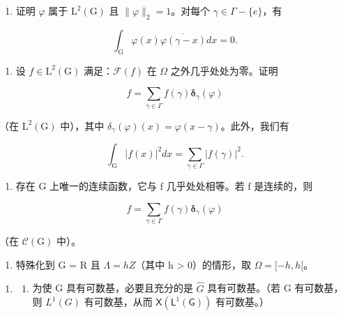 \begin{enumerate}
\def\labelenumi{\alph{enumi})}
\setcounter{enumi}{2}
\tightlist
\item
  证明 \(\varphi\) 属于 \(\mathrm{L}^2 (\mathrm{G})\) 且 \(\| \varphi \| _2 = 1\)。对每个 \(\gamma \in \Gamma -\{e\}\)，有
\end{enumerate}

\[
\int_ {\mathrm{G}} \varphi (x) \overline {{\varphi (\gamma - x)}} d x = 0.
\]

\begin{enumerate}
\def\labelenumi{\alph{enumi})}
\setcounter{enumi}{3}
\tightlist
\item
  设 \(f \in \mathrm{L}^{2}(\mathrm{G})\) 满足：\(\mathcal{F}(f)\) 在 \(\Omega\) 之外几乎处处为零。证明
\end{enumerate}

\[
f = \sum_ {\gamma \in \Gamma} f (\gamma) \boldsymbol {\delta} _ {\gamma} (\varphi)
\]

（在 \(\mathrm{L}^2 (\mathrm{G})\) 中），其中 \(\delta_{\gamma}(\varphi)(x) = \varphi (x - \gamma)\)。此外，我们有

\[
\int_ {\mathrm{G}} | f (x) | ^ {2} d x = \sum_ {\gamma \in \Gamma} | f (\gamma) | ^ {2}.
\]

\begin{enumerate}
\def\labelenumi{\alph{enumi})}
\setcounter{enumi}{4}
\tightlist
\item
  存在 G 上唯一的连续函数，它与 f 几乎处处相等。若 f 是连续的，则
\end{enumerate}

\[
f = \sum_ {\gamma \in \Gamma} f (\gamma) \boldsymbol {\delta} _ {\gamma} (\varphi)
\]

（在 \(\mathcal{C}(\mathrm{G})\) 中）。

\begin{enumerate}
\def\labelenumi{\alph{enumi})}
\setcounter{enumi}{5}
\tightlist
\item
  特殊化到 G = R 且 \(\Lambda = hZ\)（其中 h \textgreater{} 0）的情形，取 \(\Omega = [-h, h[\)。
\end{enumerate}


\begin{enumerate}
\def\labelenumi{\arabic{enumi})}
\tightlist
\item
  \begin{enumerate}
  \def\labelenumii{\alph{enumii})}
  \tightlist
  \item
    为使 G 具有可数基，必要且充分的是 \(\widehat{G}\) 具有可数基。（若 G 有可数基，则 \(L^{1}(G)\) 有可数基，从而 \(\mathsf{X}(\mathsf{L}^{1}(\mathsf{G}))\) 有可数基。）
  \end{enumerate}
\end{enumerate}

